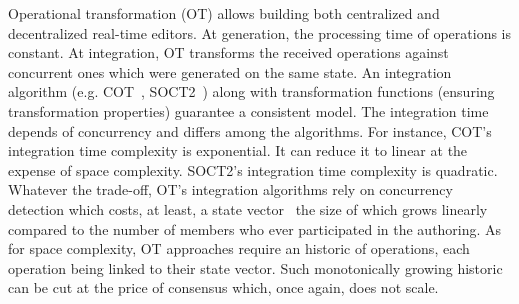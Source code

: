 \begin{asparadesc}
\item [Operational transformation] (OT) allows building both centralized and
  decentralized real-time editors. At generation, the processing time of
  operations is constant. At integration, OT transforms the received operations
  against concurrent ones which were generated on the same state. An integration
  algorithm (e.g. COT~\cite{sun2009contextbased}, SOCT2~\cite{vidot2000copies})
  along with transformation functions (ensuring transformation properties)
  guarantee a consistent model. The integration time depends of concurrency and
  differs among the algorithms.  For instance, COT's integration time complexity
  is exponential. It can reduce it to linear at the expense of space
  complexity. SOCT2's integration time complexity is quadratic.  Whatever the
  trade-off, OT's integration algorithms rely on concurrency detection which
  costs, at least, a state vector~\cite{charronbost1991concerning} the size of
  which grows linearly compared to the number of members who ever participated
  in the authoring.  As for space complexity, OT approaches
  require an historic of operations, each operation being linked to their state
  vector. Such monotonically growing historic can be cut at the price of
  consensus which, once again, does not scale.



\end{asparadesc}
